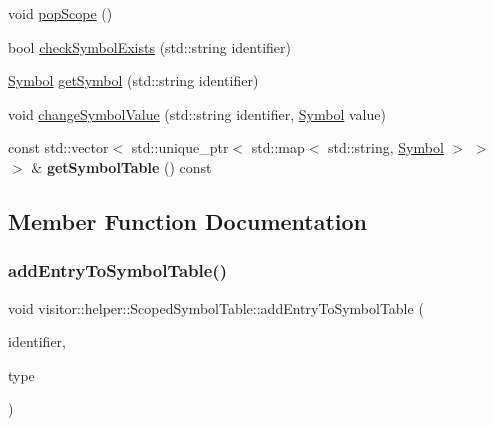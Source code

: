 \begin{DoxyCompactItemize}
\item 
void \hyperlink{classvisitor_1_1helper_1_1ScopedSymbolTable_afbeb4833a967d03a31f00306b5c21eb1}{pop\+Scope} ()
\item 
bool \hyperlink{classvisitor_1_1helper_1_1ScopedSymbolTable_a173eb4fb447dfcc8f8eaedfffeb7ae97}{check\+Symbol\+Exists} (std\+::string identifier)
\item 
\hyperlink{structvisitor_1_1helper_1_1Symbol}{Symbol} \hyperlink{classvisitor_1_1helper_1_1ScopedSymbolTable_a30038c7ddf4e21666d163d3f41382ff1}{get\+Symbol} (std\+::string identifier)
\item 
void \hyperlink{classvisitor_1_1helper_1_1ScopedSymbolTable_aaacddfaa8cb0843ba2821bd898270a1a}{change\+Symbol\+Value} (std\+::string identifier, \hyperlink{structvisitor_1_1helper_1_1Symbol}{Symbol} value)
\item 
\mbox{\label{classvisitor_1_1helper_1_1ScopedSymbolTable_a52b16de9cb62ca65654e2ceb97bda9b4}} 
const std\+::vector$<$ std\+::unique\+\_\+ptr$<$ std\+::map$<$ std\+::string, \hyperlink{structvisitor_1_1helper_1_1Symbol}{Symbol} $>$ $>$ $>$ \& {\bfseries get\+Symbol\+Table} () const
\end{DoxyCompactItemize}


\subsection{Member Function Documentation}
\mbox{\label{classvisitor_1_1helper_1_1ScopedSymbolTable_afa14e4f8f1b71fe6961120f55c20c50c}} 
\subsubsection{\texorpdfstring{add\+Entry\+To\+Symbol\+Table()}{addEntryToSymbolTable()}\hspace{0.1cm}{\footnotesize\ttfamily [1/7]}}
{\footnotesize\ttfamily void visitor\+::helper\+::\+Scoped\+Symbol\+Table\+::add\+Entry\+To\+Symbol\+Table (\begin{DoxyParamCaption}\item[{std\+::string}]{identifier,  }\item[{\hyperlink{ASTVariableDeclStatementNode_8h_a1e8e1bde0729627e3a22ffa858d5f3b9}{Symbol\+Type}}]{type }\end{DoxyParamCaption})}


